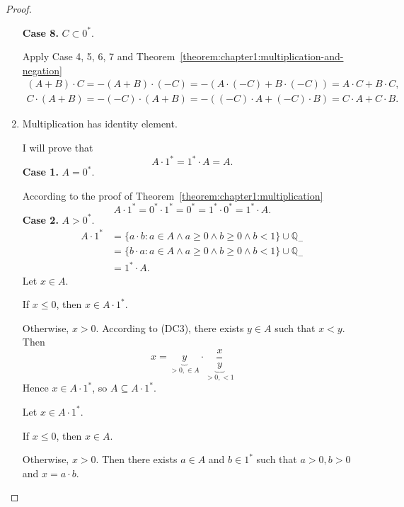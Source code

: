 \begin{proof}
\begin{enumerate}[label={(F\arabic*)}, start=5]
              \textbf{Case 8.} $C\subset {0}^{*}$.

              Apply Case 4, 5, 6, 7 and Theorem~\ref{theorem:chapter1:multiplication-and-negation}
              \[
                  \begin{split}
                      (A + B)\cdot C = -(A + B)\cdot (-C) = -(A\cdot (-C) + B\cdot (-C)) = A\cdot C + B\cdot C, \\
                      C\cdot (A + B) = -(-C)\cdot (A + B) = -((-C)\cdot A + (-C)\cdot B) = C\cdot A + C\cdot B.
                  \end{split}
              \]
        \item Multiplication has identity element.

              I will prove that
              \[
                  A\cdot {1}^{*} = {1}^{*}\cdot A = A.
              \]
              \textbf{Case 1.} $A = {0}^{*}$.

              According to the proof of Theorem~\ref{theorem:chapter1:multiplication}
              \[
                  A\cdot {1}^{*} = {0}^{*}\cdot {1}^{*} = {0}^{*} = {1}^{*}\cdot {0}^{*} = {1}^{*}\cdot A.
              \]
              \textbf{Case 2.} $A > {0}^{*}$.
              \begin{align*}
                  A\cdot {1}^{*} & = \{ a\cdot b : a\in A\land a\ge 0\land b\ge 0\land b < 1 \}\cup\mathbb{Q}_{-} \\
                                 & = \{ b\cdot a : a\in A\land a\ge 0\land b\ge 0\land b < 1 \}\cup\mathbb{Q}_{-} \\
                                 & = {1}^{*}\cdot A.
              \end{align*}
              Let $x\in A$.

              If $x\le 0$, then $x\in A\cdot {1}^{*}$.

              Otherwise, $x > 0$. According to (DC3), there exists $y\in A$ such that $x < y$. Then
              \[
                  x = \underbrace{y}_{>0, \in A}\cdot\underbrace{\dfrac{x}{y}}_{>0, <1}
              \]
              Hence $x\in A\cdot {1}^{*}$, so $A\subseteq A\cdot {1}^{*}$.

              \bigskip

              Let $x\in A\cdot {1}^{*}$.

              If $x\le 0$, then $x\in A$.

              Otherwise, $x > 0$. Then there exists $a\in A$ and $b\in {1}^{*}$ such that $a > 0, b > 0$ and $x = a\cdot b$.


\end{enumerate}
\end{proof}
